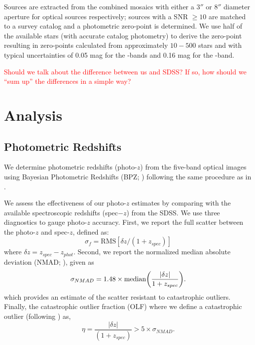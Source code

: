 \documentclass[apj, revtex4-1]{emulateapj}
\newcommand{\editorial}[1]{\textcolor{red}{#1}}
\begin{document}
Sources are extracted from the combined mosaics with either a $3''$ or $8''$ diameter aperture for optical sources respectively; sources with a SNR $\ge10$ are matched to a survey catalog and a photometric zero-point is determined. We use half of the available stars (with accurate catalog photometry) to derive the zero-point resulting in zero-points calculated from approximately $10-500$ stars and with typical uncertainties of 0.05 mag for the \sdssg\sdssr\sdssi-bands and 0.16 mag for the \sdssz-band.

\editorial{Should we talk about the difference between us and SDSS? If so, how should we ``sum up'' the differences in a simple way?}

\section{Analysis}\label{sec:analysis}
\subsection{Photometric Redshifts}
We determine photometric redshifts (photo-$z$) from the five-band optical images using Bayesian Photometric Redshifts (BPZ; \citealt{Benitez2000, Coe2006}) following the same procedure as in \cite{Menanteau2009a}.

We assess the effectiveness of our photo-$z$ estimates by comparing with the available spectroscopic redshifts (spec$-z$) from the SDSS. We use three diagnostics to gauge photo-$z$ accuracy. First, we report the full scatter between the photo-$z$ and spec-$z$, defined as:
\begin{equation}
	\sigma_f = \mathrm{RMS}[\delta z/(1+z_{spec})]
\end{equation}
where $\delta z = z_{spec} - z_{phot}$. Second, we report the normalized median absolute deviation (NMAD; \citealt{Ilbert2009, Dahlen2013, Molino2017}), given as
\begin{equation}
	\sigma_{NMAD} = 1.48 \times \mathrm{median} \bigg{(} \frac{|\delta z|}{1+z_{spec}} \bigg{)}.
\end{equation}
which provides an estimate of the scatter resistant to catastrophic outliers. Finally, the catastrophic outlier fraction (OLF) where we define a catastrophic outlier (following \citealt{Molino2017}) as,
\begin{equation}
	\eta = \frac{|\delta z|}{(1+z_{spec})} > 5 \times \sigma_{NMAD}.
\end{equation}
\end{document}
